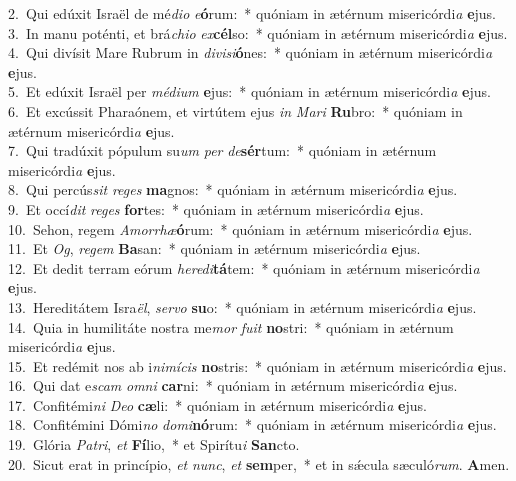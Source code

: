 {2.~}Qui edúxit Israël de mé\textit{di}\textit{o} \textit{e}\textbf{ó}rum:~* quóniam in ætérnum misericórdi\textit{a} \textbf{e}jus.\\
{3.~}In manu poténti, et brá\textit{chi}\textit{o} \textit{ex}\textbf{cél}so:~* quóniam in ætérnum misericórdi\textit{a} \textbf{e}jus.\\
{4.~}Qui divísit Mare Rubrum in \textit{di}\textit{vi}\textit{si}\textbf{ó}nes:~* quóniam in ætérnum misericórdi\textit{a} \textbf{e}jus.\\
{5.~}Et edúxit Israël per \textit{mé}\textit{di}\textit{um} \textbf{e}jus:~* quóniam in ætérnum misericórdi\textit{a} \textbf{e}jus.\\
{6.~}Et excússit Pharaónem, et virtútem ejus \textit{in} \textit{Ma}\textit{ri} \textbf{Ru}bro:~* quóniam in ætérnum misericórdi\textit{a} \textbf{e}jus.\\
{7.~}Qui tradúxit pópulum su\textit{um} \textit{per} \textit{de}\textbf{sér}tum:~* quóniam in ætérnum misericórdi\textit{a} \textbf{e}jus.\\
{8.~}Qui percús\textit{sit} \textit{re}\textit{ges} \textbf{ma}gnos:~* quóniam in ætérnum misericórdi\textit{a} \textbf{e}jus.\\
{9.~}Et occí\textit{dit} \textit{re}\textit{ges} \textbf{for}tes:~* quóniam in ætérnum misericórdi\textit{a} \textbf{e}jus.\\
{10.~}Sehon, regem \textit{A}\textit{mor}\textit{rhæ}\textbf{ó}rum:~* quóniam in ætérnum misericórdi\textit{a} \textbf{e}jus.\\
{11.~}Et \textit{Og}, \textit{re}\textit{gem} \textbf{Ba}san:~* quóniam in ætérnum misericórdi\textit{a} \textbf{e}jus.\\
{12.~}Et dedit terram eórum \textit{he}\textit{re}\textit{di}\textbf{tá}tem:~* quóniam in ætérnum misericórdi\textit{a} \textbf{e}jus.\\
{13.~}Hereditátem Isra\textit{ël}, \textit{ser}\textit{vo} \textbf{su}o:~* quóniam in ætérnum misericórdi\textit{a} \textbf{e}jus.\\
{14.~}Quia in humilitáte nostra me\textit{mor} \textit{fu}\textit{it} \textbf{no}stri:~* quóniam in ætérnum misericórdi\textit{a} \textbf{e}jus.\\
{15.~}Et redémit nos ab i\textit{ni}\textit{mí}\textit{cis} \textbf{no}stris:~* quóniam in ætérnum misericórdi\textit{a} \textbf{e}jus.\\
{16.~}Qui dat e\textit{scam} \textit{om}\textit{ni} \textbf{car}ni:~* quóniam in ætérnum misericórdi\textit{a} \textbf{e}jus.\\
{17.~}Confitémi\textit{ni} \textit{De}\textit{o} \textbf{cæ}li:~* quóniam in ætérnum misericórdi\textit{a} \textbf{e}jus.\\
{18.~}Confitémini Dómi\textit{no} \textit{do}\textit{mi}\textbf{nó}rum:~* quóniam in ætérnum misericórdi\textit{a} \textbf{e}jus.\\
{19.~}Glória \textit{Pa}\textit{tri}, \textit{et} \textbf{Fí}lio,~* et Spirítu\textit{i} \textbf{San}cto.\\
{20.~}Sicut erat in princípio, \textit{et} \textit{nunc}, \textit{et} \textbf{sem}per,~* et in sǽcula sæculó\textit{rum}. \textbf{A}men.\\
